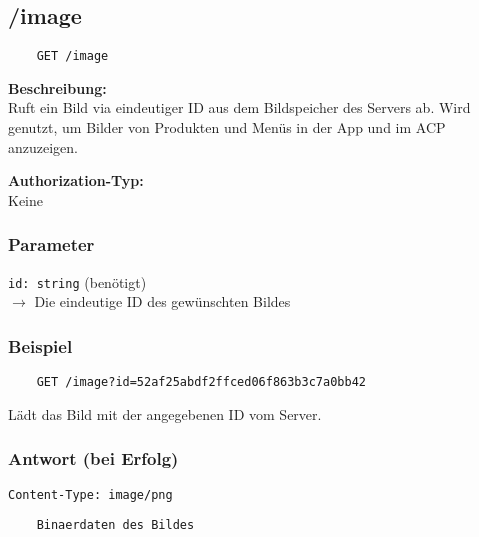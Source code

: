 \subsection{/image}
\label{image}

\begin{lstlisting}
    GET /image
\end{lstlisting}

\textbf{Beschreibung:} \\
Ruft ein Bild via eindeutiger ID aus dem Bildspeicher des Servers ab. Wird genutzt, um Bilder von Produkten und Menüs in der App und im ACP anzuzeigen.

\textbf{Authorization-Typ:} \\
Keine

\subsubsection{Parameter}

\lstinline{id: string} (benötigt) \\
$\rightarrow$ Die eindeutige ID des gewünschten Bildes

\subsubsection{Beispiel}

\begin{lstlisting}
    GET /image?id=52af25abdf2ffced06f863b3c7a0bb42
\end{lstlisting}

Lädt das Bild mit der angegebenen ID vom Server.

\subsubsection{Antwort (bei Erfolg)}

\lstinline{Content-Type: image/png}
\begin{lstlisting}
    Binaerdaten des Bildes
\end{lstlisting}